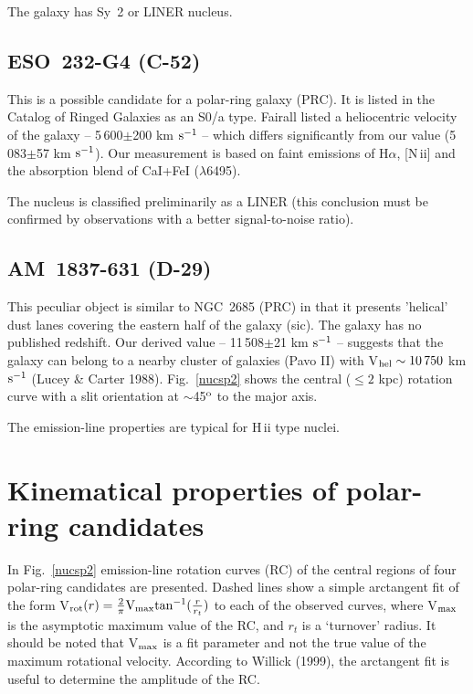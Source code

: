 The galaxy has Sy~2 or LINER nucleus.

\subsection{ESO~232-G4 (C-52)}

This is a possible  candidate for a polar-ring  galaxy (PRC).  It is listed
in the  Catalog  of Ringed  Galaxies  \cite{bu}  as an S0/a  type.  Fairall
   listed  a   heliocentric   velocity   of  the   galaxy  --
5\,600$\pm$200  km $\rm  s^{-1}$ -- which  differs  significantly  from our
value  (5\,083$\pm$57  km $\rm s^{-1}$).  Our measurement is based on faint
emissions of H$\alpha$,  [N\,{\sc ii}] and the absorption  blend of CaI+FeI
($\lambda$6495).

The nucleus is classified preliminarily as a LINER (this conclusion must be
confirmed by observations with a better signal-to-noise ratio).

\subsection{AM~1837-631 (D-29)}

This  peculiar  object is similar  to  NGC~2685  (PRC) in that it  presents
'helical'  dust lanes  covering the eastern half of the galaxy  (sic).  The
galaxy has no published  redshift.  Our derived value --  11\,508$\pm$21 km
$\rm s^{-1}$ -- suggests that the galaxy can belong to a nearby  cluster of
galaxies (Pavo II) with V$_{\rm  hel}\sim10\,750$ km $\rm s^{-1}$ (Lucey \&
Carter 1988).  Fig.~\ref{nucsp2}  shows the central  ($\leq2$ kpc) rotation
curve with a slit orientation at $\sim$45$^{\rm o}$ to the major axis.

The emission-line properties are typical for H\,{\sc ii} type nuclei.

\section{Kinematical properties of polar-ring candidates}

In  Fig.~\ref{nucsp2}  emission-line  rotation  curves  (RC) of the central
regions of four  polar-ring  candidates are presented.  Dashed lines show a
simple arctangent fit of the form \hbox{V$_{\rm  rot}(r)=\frac{2}{\pi} {\rm
V_{\rm  max}}  {\rm  tan}^{-1}(\frac{r}{r_t})$}  to  each  of the  observed
curves, where V$_{\rm max}$ is the asymptotic  maximum value of the RC, and
$r_t$ is a `turnover'  radius.  It should be noted that V$_{\rm  max}$ is a
fit parameter  and not the true value of the maximum  rotational  velocity.
According to Willick  (1999), the arctangent fit is useful to determine the
amplitude of the RC.


